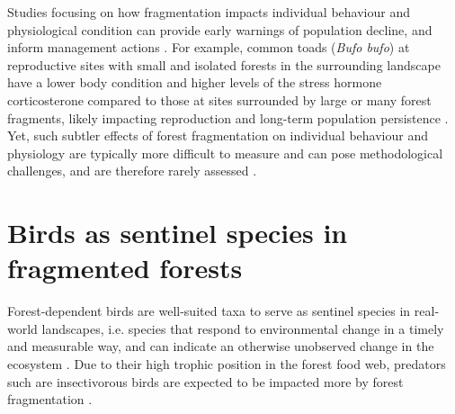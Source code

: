\documentclass[10pt, twoside]{book} %
\begin{document}
Studies focusing on how fragmentation impacts individual behaviour and physiological condition can provide early warnings of population decline, and inform management actions \citep{Cooke2013, Fardila2017}. For example, common toads (\textit{Bufo bufo}) at reproductive sites with small and isolated forests in the surrounding landscape have a lower body condition and higher levels of the stress hormone corticosterone compared to those at sites surrounded by large or many forest fragments, likely impacting reproduction and long-term population persistence \citep{Janin2011}. Yet, such subtler effects of forest fragmentation on individual behaviour and physiology are typically more difficult to measure and can pose methodological challenges, and are therefore rarely assessed \citep{Fardila2017}. 

\clearpage	
	\section{Birds as sentinel species in fragmented forests}
	
Forest-dependent birds are well-suited taxa to serve as sentinel species in real-world landscapes, i.e. species that respond to environmental change in a timely and measurable way, and can indicate an otherwise unobserved change in the ecosystem \citep{Hazen2019}.  Due to their high trophic position in the forest food web, predators such are insectivorous birds are expected to be impacted more by forest fragmentation \citep{VanNouhuys2005}.\\
\end{document}
